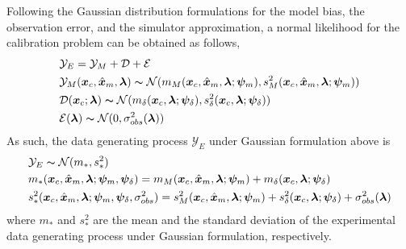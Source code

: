 Following the Gaussian distribution formulations for the model bias, the observation error, and the
simulator approximation, a normal likelihood for the calibration problem can be obtained as follows,
\begin{equation}
    \begin{split}
				& \mathcal{Y}_E = \mathcal{Y}_M + \mathcal{D} + \mathcal{E} \\
				& \mathcal{Y}_M (\bm{x}_c, \hat{\bm{x}}_m, \bm{\lambda}) \thicksim \mathcal{N}(m_M(\bm{x}_c, \hat{\bm{x}}_m, \bm{\lambda}; \bm{\psi}_{m}), s_M^2(\bm{x}_c, \hat{\bm{x}}_m, \bm{\lambda}; \bm{\psi}_{m})) \\
        & \mathcal{D}(\bm{x}_c; \bm{\lambda}) \thicksim \mathcal{N}(m_\delta(\bm{x}_c, \bm{\lambda}; \bm{\psi}_\delta), s_\delta^2(\bm{x}_c, \bm{\lambda}; \bm{\psi}_\delta)) \\
        & \mathcal{E}(\boldsymbol{\lambda}) \thicksim \mathcal{N}(0, \sigma_{obs}^2(\bm{\lambda})) \\
    \end{split}
\label{eq:bc_data_generating_models_gaussian}
\end{equation}
As such, the data generating process $\mathcal{Y}_E$ under Gaussian formulation above is
\begin{equation}
	\begin{split}
		& \mathcal{Y}_E \thicksim \mathcal{N}(m_*, s^2_*) \\
		& m_*(\bm{x}_c, \hat{\bm{x}}_m, \bm{\lambda}; \bm{\psi}_m, \bm{\psi}_\delta) = m_M(\bm{x}_c, \hat{\bm{x}}_m, \bm{\lambda}; \bm{\psi}_m) + m_\delta(\bm{x}_c, \bm{\lambda}; \bm{\psi}_\delta) \\
		& s^2_*(\bm{x}_c, \hat{\bm{x}}_m, \bm{\lambda}; \bm{\psi}_m, \bm{\psi}_\delta, \sigma_{obs}^2) = s_M^2(\bm{x}_c, \hat{\bm{x}}_m, \bm{\lambda}; \bm{\psi}_{m}) + s_\delta^2(\bm{x}_c, \bm{\lambda}; \bm{\psi}_\delta) + \sigma_{obs}^2(\bm{\lambda})
	\end{split}
\label{eq:bc_data_model_gaussian}
\end{equation}
where $m_*$ and $s^2_*$ are the mean and the standard deviation of the experimental data generating process under Gaussian formulation, respectively.

